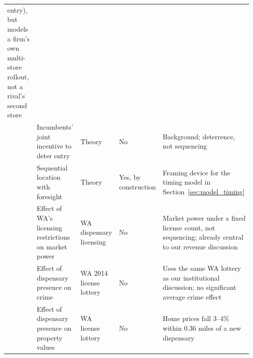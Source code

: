 \documentclass[12pt]{article}
\begin{document}
\begin{table}[htbp]
\begin{tabular}{p{2.6cm}p{3.6cm}p{2.6cm}p{2.3cm}p{3.5cm}}
  entry), but models a firm's own multi-store rollout, not a rival's second store \\
\citet{GilbertVives1986} & Incumbents' joint incentive to deter entry & Theory & No & Background; deterrence,
  not sequencing \\
\citet{PrescottVisscher1977} & Sequential location with foresight & Theory & Yes, by construction & Framing
  device for the timing model in Section~\ref{sec:model_timing} \\
\citet{HollenbeckUetake2021} & Effect of WA's licensing restrictions on market power & WA dispensary
  licensing & No & Market power under a fixed license count, not sequencing; already central to our revenue
  discussion \\
\citet{DongTyndall2024} & Effect of dispensary presence on crime & WA 2014 license lottery & No & Uses the
  same WA lottery as our institutional discussion; no significant average crime effect \\
\citet{ThomasTian2021} & Effect of dispensary presence on property values & WA license lottery & No & Home
  prices fall 3--4\% within 0.36 miles of a new dispensary \\
\bottomrule
\end{tabular}
\end{table}

\newpage


\end{document}
